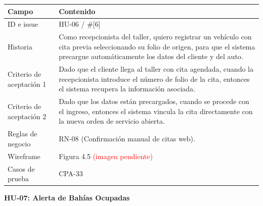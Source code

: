 {\def\LTcaptype{none} %
\begin{longtable}[]{@{}
  >{\raggedright\arraybackslash}p{}
  >{\raggedright\arraybackslash}p{}@{}}
\toprule\noalign{}
\begin{minipage}[b]{\linewidth}\raggedright
\textbf{Campo}
\end{minipage} & \begin{minipage}[b]{\linewidth}\raggedright
\textbf{Contenido}
\end{minipage} \\
\midrule\noalign{}
\endhead
\bottomrule\noalign{}
\endlastfoot
ID e issue & HU-06 / \#{[}6{]} \\
Historia & Como recepcionista del taller, quiero registrar un vehículo
con cita previa seleccionando su folio de origen, para que el sistema
precargue automáticamente los datos del cliente y del auto. \\
Criterio de aceptación 1 & Dado que el cliente llega al taller con cita
agendada, cuando la recepcionista introduce el número de folio de la
cita, entonces el sistema recupera la información asociada. \\
Criterio de aceptación 2 & Dado que los datos están precargados, cuando
se procede con el ingreso, entonces el sistema vincula la cita
directamente con la nueva orden de servicio abierta. \\
Reglas de negocio & RN-08 (Confirmación manual de citas web). \\
Wireframe & Figura 4.5 \textcolor{red}{(imagen pendiente)} \\
Casos de prueba & CPA-33 \\
\end{longtable}
}

\textbf{HU-07: Alerta de Bahías Ocupadas}

